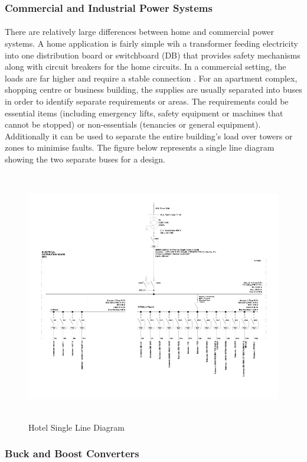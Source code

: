 \subsubsection{Commercial and Industrial Power Systems}

\paragraph{}
There are relatively large differences between home and commercial power systems. A home application is fairly simple wih a transformer feeding electricity into one distribution board or switchboard (DB) that provides safety mechanisms along with circuit breakers for the home circuits. In a commercial setting, the loads are far higher and require a stable connection \cite{Baran2003}. For an apartment complex, shopping centre or business building, the supplies are usually separated into buses in order to identify separate requirements or areas. The requirements could be essential items (including emergency lifts, safety equipment or machines that cannot be stopped) or non-essentials (tenancies or general equipment). Additionally it can be used to separate the entire building's load over towers or zones to minimise faults. The figure below represents a single line diagram showing the two separate buses for a design. 

\begin{figure}[H]
\hfill\includegraphics[width = 160mm, height = 110mm]{images/PCad_SLD}\hspace*{\fill}
\caption{{Hotel Single Line Diagram}}
\label{fig:SLD}
\end{figure}   

\subsubsection{Buck and Boost Converters}

\paragraph{}

\newpage
